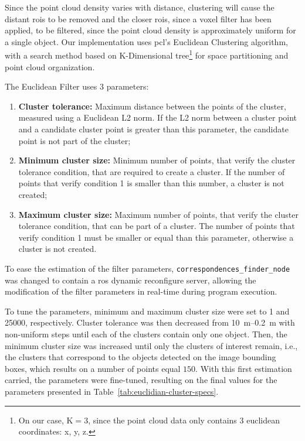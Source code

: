 Since the point cloud density varies with distance, clustering will cause the distant \acp{roi} to be removed and the closer \acp{roi}, since a voxel filter has been applied, to be filtered, since the point cloud density is approximately uniform for a single object. Our implementation uses \ac{pcl}'s Euclidean Clustering algorithm, with a search method based on K-Dimensional tree\footnote{On our case, K$=3$, since the point cloud data only contains 3 euclidean coordinates: x, y, z.} for space partitioning and point cloud organization.

The Euclidean Filter uses 3 parameters:

\begin{enumerate}
	\label{enum:object-detection:cluster-parameters}
	\item \textbf{Cluster tolerance:} Maximum distance between the points of the cluster, measured using a Euclidean L2 norm. If the L2 norm between a cluster point and a candidate cluster point is greater than this parameter, the candidate point is not part of the cluster;
	\item \textbf{Minimum cluster size:} Minimum number of points, that verify the cluster tolerance condition, that are required to create a cluster. If the number of points that verify condition 1 is smaller than this number, a cluster is not created;
	\item \textbf{Maximum cluster size:} Maximum number of points, that verify the cluster tolerance condition, that can be part of a cluster. The number of points that verify condition 1 must be smaller or equal than this parameter, otherwise a cluster is not created.
\end{enumerate}

To ease the estimation of the filter parameters, \texttt{correspondences\_finder\_node} was changed to contain a \ac{ros} dynamic reconfigure server, allowing the modification of the filter parameters in real-time during program execution. 

To tune the parameters, minimum and maximum cluster size were set to 1 and 25000, respectively. Cluster tolerance was then decreased from \SIrange{10}{0.2}{\meter} with non-uniform steps until each of the clusters contain only one object. Then, the minimum cluster size was increased until only the clusters of interest remain, i.e., the clusters that correspond to the objects detected on the image bounding boxes, which results on a number of points equal $150$. With this first estimation carried, the parameters were fine-tuned, resulting on the final values for the parameters presented in Table~\ref{tab:euclidian-cluster-specs}.

